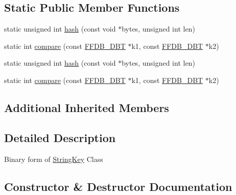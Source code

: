 \subsection*{Static Public Member Functions}
\begin{DoxyCompactItemize}
\item 
static unsigned int \mbox{\hyperlink{classFILEDB_1_1StringKey_a505786f9d6a7eec5531eac0f0026d8c3}{hash}} (const void $\ast$bytes, unsigned int len)
\item 
static int \mbox{\hyperlink{classFILEDB_1_1StringKey_a22a3b33f93050dffa239cfc106044935}{compare}} (const \mbox{\hyperlink{other__libs_2filedb_2filehash_2ffdb__db_8h_aa2e0984399491df0fdd20898ca8758f9}{F\+F\+D\+B\+\_\+\+D\+BT}} $\ast$k1, const \mbox{\hyperlink{other__libs_2filedb_2filehash_2ffdb__db_8h_aa2e0984399491df0fdd20898ca8758f9}{F\+F\+D\+B\+\_\+\+D\+BT}} $\ast$k2)
\item 
static unsigned int \mbox{\hyperlink{classFILEDB_1_1StringKey_a505786f9d6a7eec5531eac0f0026d8c3}{hash}} (const void $\ast$bytes, unsigned int len)
\item 
static int \mbox{\hyperlink{classFILEDB_1_1StringKey_a22a3b33f93050dffa239cfc106044935}{compare}} (const \mbox{\hyperlink{other__libs_2filedb_2filehash_2ffdb__db_8h_aa2e0984399491df0fdd20898ca8758f9}{F\+F\+D\+B\+\_\+\+D\+BT}} $\ast$k1, const \mbox{\hyperlink{other__libs_2filedb_2filehash_2ffdb__db_8h_aa2e0984399491df0fdd20898ca8758f9}{F\+F\+D\+B\+\_\+\+D\+BT}} $\ast$k2)
\end{DoxyCompactItemize}
\subsection*{Additional Inherited Members}


\subsection{Detailed Description}
Binary form of \mbox{\hyperlink{classFILEDB_1_1StringKey}{String\+Key}} Class 

\subsection{Constructor \& Destructor Documentation}
\mbox{\label{classFILEDB_1_1StringKey_ada360436c743f4464e82b0cb2757d229}} 
